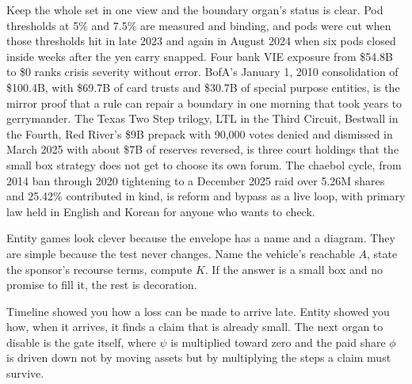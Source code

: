 Keep the whole set in one view and the boundary organ's status is clear. Pod thresholds at 5\% and 7.5\% are measured and binding, and pods were cut when those thresholds hit in late 2023 and again in August 2024 when six pods closed inside weeks after the yen carry snapped. Four bank VIE exposure from \$54.8B to \$0 ranks crisis severity without error. BofA's January 1, 2010 consolidation of \$100.4B, with \$69.7B of card trusts and \$30.7B of special purpose entities, is the mirror proof that a rule can repair a boundary in one morning that took years to gerrymander. The Texas Two Step trilogy, LTL in the Third Circuit, Bestwall in the Fourth, Red River's \$9B prepack with 90,000 votes denied and dismissed in March 2025 with about \$7B of reserves reversed, is three court holdings that the small box strategy does not get to choose its own forum. The chaebol cycle, from 2014 ban through 2020 tightening to a December 2025 raid over 5.26M shares and 25.42\% contributed in kind, is reform and bypass as a live loop, with primary law held in English and Korean for anyone who wants to check.

Entity games look clever because the envelope has a name and a diagram. They are simple because the test never changes. Name the vehicle's reachable $A$, state the sponsor's recourse terms, compute $K$. If the answer is a small box and no promise to fill it, the rest is decoration.

Timeline showed you how a loss can be made to arrive late. Entity showed you how, when it arrives, it finds a claim that is already small. The next organ to disable is the gate itself, where $\psi$ is multiplied toward zero and the paid share $\phi$ is driven down not by moving assets but by multiplying the steps a claim must survive.

